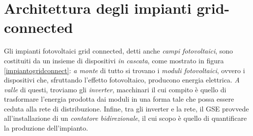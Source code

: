 %
\section{Architettura degli impianti grid-connected}
Gli impianti fotovoltaici grid connected, detti anche \emph{campi fotovoltaici}, 
sono costituiti da un insieme di dispositivi \emph{in cascata}, come mostrato in 
figura \ref{impiantogridconnect}: \emph{a monte} di tutto si trovano i \emph{moduli 
fotovoltaici}, ovvero i dispositivi che, sfruttando l'effetto fotovoltaico, 
producono energia elettrica. \emph{A valle} di questi, troviamo gli \emph{inverter}, 
macchinari il cui compito \`e quello di trasformare l'energia prodotta dai moduli 
in una forma tale che possa essere ceduta alla rete di distribuzione. Infine, tra 
gli inverter e la rete, il GSE provvede all'installazione di un \emph{contatore 
bidirezionale}, il cui scopo \`e quello di quantificare la produzione dell'impianto.
%

